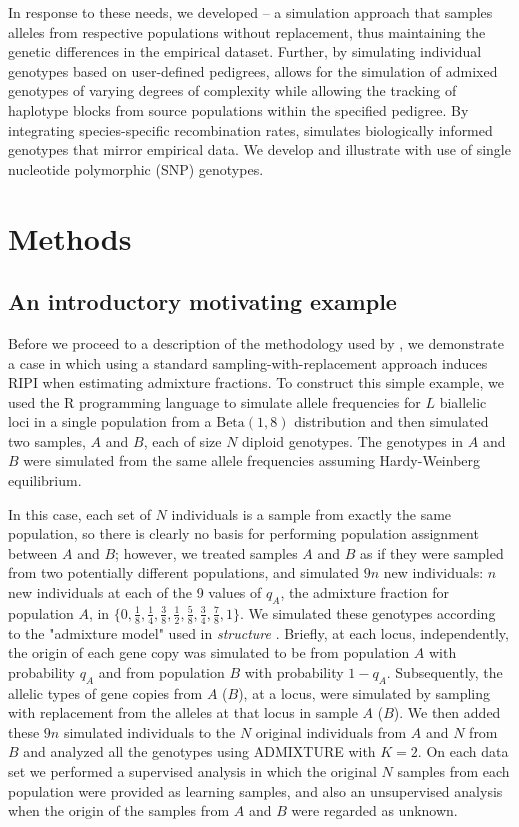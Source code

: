 In response to these needs, we developed \gscramble{} – a simulation approach that samples alleles from respective populations without 
replacement, thus maintaining the genetic differences in the empirical dataset.
Further, by simulating individual genotypes based on user-defined pedigrees, \gscramble{} allows for the simulation of admixed genotypes of 
varying degrees of complexity while allowing the tracking of haplotype blocks from source populations within the specified pedigree.
By integrating species-specific recombination rates, \gscramble{} simulates biologically informed genotypes that mirror empirical data.
We develop and illustrate \gscramble{} with use of single nucleotide polymorphic (SNP) genotypes.




\section*{Methods}

\subsection*{An introductory motivating example}


Before we proceed to a description of the methodology used by \gscramble{},
we demonstrate a case in which using a standard sampling-with-replacement
approach induces RIPI when estimating admixture fractions.
To construct this simple example, we used the R programming language \citep{Rcoreteam} to
simulate allele frequencies for $L$ biallelic
loci in a single population from a $\mathrm{Beta}(1, 8)$ distribution and then simulated
two samples, $A$ and $B$, each of size $N$ diploid genotypes. The genotypes in $A$ and $B$ were simulated
from the same allele frequencies assuming Hardy-Weinberg equilibrium.

In this case,
each set of $N$ individuals is a sample from exactly the same population, so
there is clearly no basis for performing population assignment between $A$ and $B$;
however, we treated samples $A$ and $B$ as if they were sampled from two potentially different
populations, and simulated $9n$ new individuals: $n$ new individuals at each of the 9 values of
$q_A$, the admixture fraction for population $A$, in  $\{0, \frac{1}{8}, \frac{1}{4}, \frac{3}{8}, \frac{1}{2}, \frac{5}{8}, \frac{3}{4}, \frac{7}{8}, 1\}$. 
We simulated these genotypes according to the "admixture model" used in {\em structure} \citep{pritchard2000inference}.  Briefly, at each 
locus, independently, the origin
of each gene copy was simulated to be from
population $A$ with probability $q_A$ and from population $B$ with probability $1-q_A$.  Subsequently,
the allelic types of gene copies from $A$ ($B$), at a locus, were simulated by sampling with replacement
from the alleles at that locus in sample $A$ ($B$).
We then added these $9n$ simulated individuals to the $N$ original individuals  from $A$ and $N$ from $B$
and analyzed all the genotypes using ADMIXTURE with $K=2$. On each data set we performed a supervised analysis in which the original 
$N$ samples from each
population were provided as learning samples, and also an
unsupervised analysis when the origin of the samples from $A$ and $B$ were regarded as unknown.

